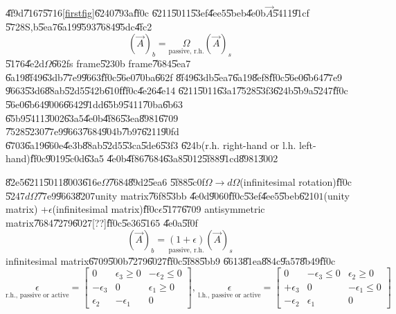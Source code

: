 \documentclass[12pt]{article}
\begin{document}
\bigskip \U{4f9d}\U{7167}\U{5716}\ref{firstfig}\U{6240}\U{793a}\U{ff0c}%
\U{6211}\U{5011}\U{53ef}\U{4ee5}\U{5beb}\U{4e0b}$\vec{A}$\U{5411}\U{91cf}%
\U{5728}S,b\U{5ea7}\U{6a19}\U{9593}\U{7684}\U{95dc}\U{4fc2}%
\begin{equation*}
\left( \vec{A}\right) _{b}=\underset{\text{passive, r.h.}}{\Omega }\left( 
\vec{A}\right) _{s}
\end{equation*}%
\U{5176}\U{4e2d}$\Omega $\U{662f}s frame\U{5230}b frame\U{7684}\U{5ea7}%
\U{6a19}\U{8f49}\U{63db}\U{77e9}\U{9663}\U{ff0c}\U{56e0}\U{70ba}\U{662f}%
\U{8f49}\U{63db}\U{5ea7}\U{6a19}\U{8ef8}\U{ff0c}\U{56e0}\U{6b64}\U{77e9}%
\U{9663}\U{53d6}\U{88ab}\U{52d5}\U{542b}\U{610f}\U{ff0c}\U{4e26}\U{4e14}%
\U{6211}\U{5011}\U{63a1}\U{7528}\U{53f3}\U{624b}\U{5b9a}\U{5247}\U{ff0c}%
\U{56e0}\U{6b64}\U{9006}\U{6642}\U{91dd}\U{65b9}\U{5411}\U{70ba}\U{6b63}%
\U{65b9}\U{5411}\U{3002}\U{63a5}\U{4e0b}\U{4f86}\U{53ea}\U{8981}\U{6709}%
\U{7528}\U{5230}\U{77e9}\U{9663}\U{7684}\U{904b}\U{7b97}\U{6211}\U{90fd}%
\U{6703}\U{6a19}\U{660e}\U{4e3b}\U{88ab}\U{52d5}\U{53ca}\U{5de6}\U{53f3}%
\U{624b}(r.h. right-hand or l.h. left-hand)\U{ff0c}\U{9019}\U{5c0d}\U{63a5}%
\U{4e0b}\U{4f86}\U{7684}\U{63a8}\U{5012}\U{5f88}\U{91cd}\U{8981}\U{3002}

\U{82e5}\U{6211}\U{5011}\U{8003}\U{616e}$\Omega $\U{7684}\U{89d2}\U{5ea6}%
\U{5f88}\U{5c0f}$\Omega \rightarrow d\Omega $(infinitesimal rotation)\U{ff0c}%
\U{5247}$d\Omega $\U{77e9}\U{9663}\U{8207}unity matrix\U{76f8}\U{53bb}%
\U{4e0d}\U{9060}\U{ff0c}\U{53ef}\U{4ee5}\U{5beb}\U{6210}$1$(unity matrix) +$%
\epsilon $(infinitesimal matrix)\U{ff0c}$\epsilon $\U{5177}\U{6709}%
antisymmetric matrix\U{7684}\U{7279}\U{6027}[??]\U{ff0c}\U{5e36}\U{5165}%
\U{4e0a}\U{5f0f}%
\begin{equation*}
\left( \vec{A}\right) _{b}=\underset{\text{passive, r.h.}}{\left( 1+\epsilon
\right) }\left( \vec{A}\right) _{s}
\end{equation*}%
infinitesimal matrix\U{6709}\U{500b}\U{7279}\U{6027}\U{ff0c}\U{5f88}\U{5bb9}%
\U{6613}\U{81ea}\U{884c}\U{9a57}\U{8b49}\U{ff0c}%
\begin{equation*}
\underset{\text{r.h., passive or active}}{\epsilon }=\left[ 
\begin{array}{ccc}
0 & \epsilon _{3}\geq 0 & -\epsilon _{2}\leq 0 \\ 
-\epsilon _{3} & 0 & \epsilon _{1}\geq 0 \\ 
\epsilon _{2} & -\epsilon _{1} & 0%
\end{array}%
\right] \text{, }\underset{\text{l.h., passive or active}}{\epsilon }=\left[ 
\begin{array}{ccc}
0 & -\epsilon _{3}\leq 0 & \epsilon _{2}\geq 0 \\ 
+\epsilon _{3} & 0 & -\epsilon _{1}\leq 0 \\ 
-\epsilon _{2} & \epsilon _{1} & 0%
\end{array}%
\right]
\end{equation*}
\end{document}
